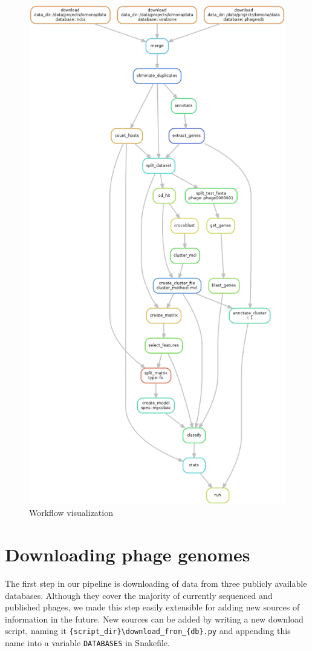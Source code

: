 \begin{figure}[h]
\includegraphics[height=\textheight]{./images/mcl.png}
\centering
\caption{Workflow visualization}
\label{fig:dag}
\end{figure}

\section{Downloading phage genomes}
The first step in our pipeline is downloading of data from three publicly available databases.
Although they cover the majority of currently sequenced and published phages, we made this step easily extensible for adding new sources of information in the future.
New sources can be added by writing a new download script, naming it \verb|{script_dir}\download_from_{db}.py| and appending this name into a variable \verb|DATABASES| in Snakefile.

